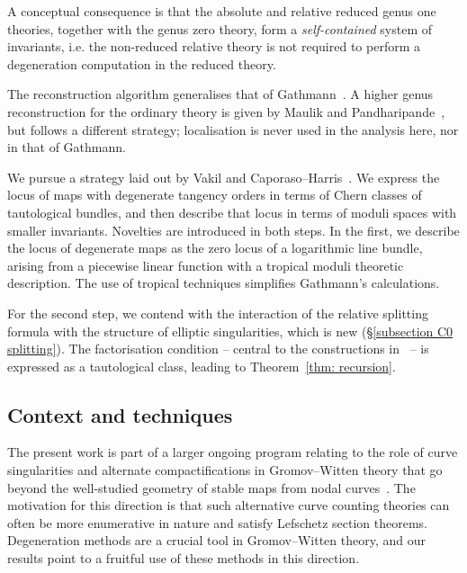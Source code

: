 \documentclass[11pt]{amsart}
\theoremstyle{definition}
\theoremstyle{definition}
\begin{document}
A conceptual consequence is that the absolute and relative reduced genus one theories, together with the genus zero theory, form a \textit{self-contained} system of invariants, i.e. the non-reduced relative theory is not required to perform a degeneration computation in the reduced theory. %

The reconstruction algorithm generalises that of Gathmann~\cite{Ga}. A higher genus reconstruction for the ordinary theory is given by Maulik and Pandharipande~\cite{MaulikPandharipande}, but follows a different strategy; localisation is never used in the analysis here, nor in that of Gathmann. 

We pursue a strategy laid out by Vakil and Caporaso--Harris~\cite{CH98,Vre}. We express the locus of maps with degenerate tangency orders in terms of Chern classes of tautological bundles, and then describe that locus in terms of moduli spaces with smaller invariants. Novelties are introduced in both steps. In the first, we describe the locus of degenerate maps as the zero locus of a logarithmic line bundle, arising from a piecewise linear function with a tropical moduli theoretic description. The use of tropical techniques simplifies Gathmann's calculations.

For the second step, we contend with the interaction of the relative splitting formula with the structure of elliptic singularities, which is new (\S \ref{subsection C0 splitting}). The factorisation condition -- central to the constructions in~\cite{RSPW,RSPW2} -- is expressed as a tautological class, leading to Theorem~\ref{thm: recursion}.

\subsection{Context and techniques} The present work is part of a larger ongoing program relating to the role of curve singularities and alternate compactifications in Gromov--Witten theory that go beyond the well-studied geometry of stable maps from nodal curves~\cite{BC20,BCM18,Boz19,HLN,RSPW,RSPW2}. The motivation for this direction is that such alternative curve counting theories can often be more {enumerative} in nature and satisfy Lefschetz section theorems. Degeneration methods are a crucial tool in Gromov--Witten theory, and our results point to a fruitful use of these methods in this direction. 
\end{document}
